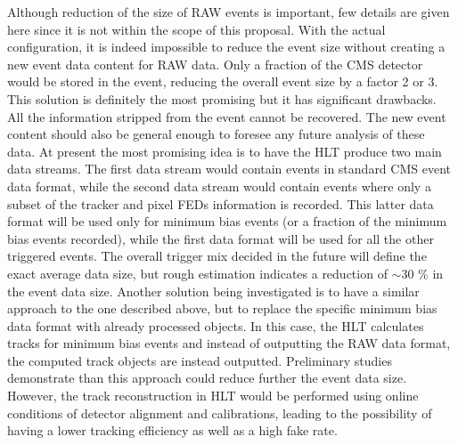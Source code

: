 Although reduction of the size of RAW events is important, few details are given here since it is not within the scope of this proposal. With the actual configuration, it is indeed impossible to reduce the event size without creating a new event data content for RAW data. Only a fraction of the CMS detector would be stored in the event, reducing the overall event size by a factor 2 or 3. This solution is definitely the most promising but it has significant drawbacks. All the information stripped from the event cannot be recovered. The new event content should also be general enough to foresee any future analysis of these data. At present the most promising idea is to have the HLT produce two main data streams. The first data stream would contain events in standard CMS event data format, while the second data stream would contain events where only a subset of the tracker and pixel FEDs information is recorded. This latter data format will be used only for minimum bias events (or a fraction of the minimum bias events recorded), while the first data format will be used for all the other triggered events. The overall trigger mix decided in the future will define the exact average data size, but rough estimation indicates a reduction of $\sim 30$ \% in the event data size. Another solution being investigated is to have a similar approach to the one described above, but to replace the specific minimum bias data format with already processed objects. In this case, the HLT calculates tracks for minimum bias events and instead of outputting the RAW data format, the computed track objects are instead outputted. Preliminary studies demonstrate than this approach could reduce further the event data size. However, the track reconstruction in HLT would be performed using online conditions of detector alignment and calibrations, leading to the possibility of having a lower tracking efficiency as well as a high fake rate. 





